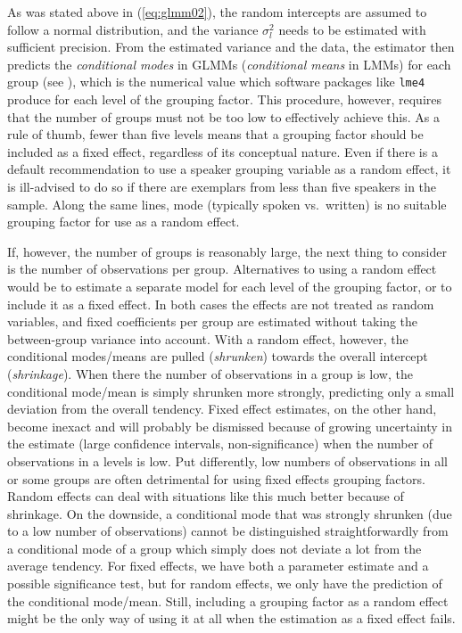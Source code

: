 \documentclass[a4paper,12pt]{article}
\begin{document}
As was stated above in (\ref{eq:glmm02}), the random intercepts are assumed to follow a normal distribution, and the variance $\sigma_l^2$ needs to be estimated with sufficient precision.
From the estimated variance and the data, the estimator then predicts the \textit{conditional modes} in GLMMs (\textit{conditional means} in LMMs) for each group (see \citealt[Ch.~1]{Bates2010}), which is the numerical value which software packages like \texttt{lme4} produce for each level of the grouping factor.
This procedure, however, requires that the number of groups must not be too low to effectively achieve this.
As a rule of thumb, fewer than five levels means that a grouping factor should be included as a fixed effect, regardless of its conceptual nature.
Even if there is a default recommendation to use a speaker grouping variable as a random effect, it is ill-advised to do so if there are exemplars from less than five speakers in the sample.
Along the same lines, mode (typically spoken vs.\ written) is no suitable grouping factor for use as a random effect.

If, however, the number of groups is reasonably large, the next thing to consider is the number of observations per group.
Alternatives to using a random effect would be to estimate a separate model for each level of the grouping factor, or to include it as a fixed effect.
In both cases the effects are not treated as random variables, and fixed coefficients per group are estimated without taking the between-group variance into account.
With a random effect, however, the conditional modes\slash means are pulled (\textit{shrunken}) towards the overall intercept (\textit{shrinkage}).
When there the number of observations in a group is low, the conditional mode\slash mean is simply shrunken more strongly, predicting only a small deviation from the overall tendency.
Fixed effect estimates, on the other hand, become inexact and will probably be dismissed because of growing uncertainty in the estimate (large confidence intervals, non-significance) when the number of observations in a levels is low.
Put differently, low numbers of observations in all or some groups are often detrimental for using fixed effects grouping factors.
Random effects can deal with situations like this much better because of shrinkage.
On the downside, a conditional mode that was strongly shrunken (due to a low number of observations) cannot be distinguished straightforwardly from a conditional mode of a group which simply does not deviate a lot from the average tendency.
For fixed effects, we have both a parameter estimate and a possible significance test, but for random effects, we only have the prediction of the conditional mode\slash mean.
Still, including a grouping factor as a random effect might be the only way of using it at all when the estimation as a fixed effect fails.
\end{document}

